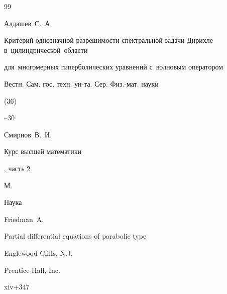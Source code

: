 \begin{thebibliography}{99}

\by Алдашев~С.~А.

\paper Критерий однозначной разрешимости спектральной задачи Дирихле в~цилиндрической~области

для~многомерных гиперболических уравнений с~волновым оператором

\jour Вестн. Сам. гос. техн. ун-та. Сер. Физ.-мат. науки


(36)

--30







\by Смирнов~В.~И.

\book  Курс высшей математики

, часть 2

\publaddr М.

\publ Наука






\by  Friedman~A.

\book Partial differential equations of parabolic type


\publaddr Englewood Cliffs, N.J.

\publ Prentice-Hall, Inc. 

\totalpages xiv+347 






\end{thebibliography}



\newpage



\makeentitle







